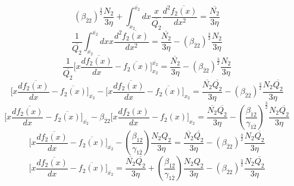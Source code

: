 \documentclass[fleqn, 10pt]{article}
\begin{document}
        \begin{equation*}
            (\beta_{\overline{2}2})^\frac{3}{2}\frac{N_{2}}{3\eta} + \int^{\overline{x_{2}}}_{x_{2}}dx \frac{x}{\overline{Q_{2}}} \frac{d^2\overline{f_{2}(x)}}{dx^2} = \frac{\overline{N_{2}}}{3\eta}
        \end{equation*}
        \begin{equation*}
            \frac{1}{\overline{Q_{2}}}\int^{\overline{x_{2}}}_{x_{2}}dx x \frac{d^2\overline{f_{2}(x)}}{dx^2} = \frac{\overline{N_{2}}}{3\eta} - (\beta_{\overline{2}2})^\frac{3}{2} \frac{N_{2}}{3\eta}
        \end{equation*}
        \begin{equation*}
            \frac{1}{\overline{Q_{2}}} \biggl[x\frac{d\overline{f_{2}(x)}}{dx} - \overline{f_{2}(x)}\biggr]^{\overline{x_{2}}}_{x_{2}} = \frac{\overline{N_{2}}}{3\eta} - (\beta_{\overline{2}2})^\frac{3}{2} \frac{N_{2}}{3\eta}
        \end{equation*}
        \begin{equation*}
            \biggl[x\frac{d\overline{f_{2}(x)}}{dx}-\overline{f_{2}(x)}\biggr]_{\overline{x_{2}}} - \biggl[x\frac{d\overline{f_{2}(x)}}{dx}-\overline{f_{2}(x)}\biggr]_{x_{2}} = \frac{\overline{N_{2}}\overline{Q_{2}}}{3\eta} - (\beta_{\overline{2}2})^\frac{3}{2} \frac{N_{2}\overline{Q_{2}}}{3\eta}
        \end{equation*}
        \begin{equation*}
            \biggl[x\frac{d\overline{f_{2}(x)}}{dx} - \overline{f_{2}(x)}\biggr]_{\overline{x_{2}}} - \beta_{\overline{2}2}\biggl[x\frac{df_{2}(x)}{dx} - f_{2}(x)\biggr]_{x_{2}} = \frac{\overline{N_{2}}\overline{Q_{2}}}{3\eta} -\left(\frac{\beta_{12}}{\gamma_{1\overline{2}}}\right)^\frac{3}{2}\frac{N_{2}\overline{Q_{2}}}{3\eta}
        \end{equation*}
        \begin{equation*}
            \biggl[x\frac{d\overline{f_{2}(x)}}{dx}-\overline{f_{2}(x)}\biggr]_{\overline{x_{2}}} - \left(\frac{\beta_{12}}{\gamma_{1\overline{2}}}\right)\frac{N_{2}Q_{2}}{3\eta} = \frac{\overline{N_{2}}\overline{Q_{2}}}{3\eta}-(\beta_{\overline{2}2})^\frac{3}{2} \frac{N_{2}\overline{Q_{2}}}{3\eta}
        \end{equation*}
        \begin{equation}
            \biggl[x\frac{d\overline{f_{2}(x)}}{dx}- \overline{f_{2}(x)}\biggr]_{\overline{x_{2}}} = \frac{\overline{N_{2}}\overline{Q_{2}}}{3\eta}+ \left(\frac{\beta_{12}}{\gamma_{1\overline{2}}}\right)\frac{N_{2}Q_{2}}{3\eta} - (\beta_{\overline{2}2})^\frac{3}{2} \frac{N_{2}\overline{Q_{2}}}{3\eta}
            \label{85}
        \end{equation}
\end{document}
